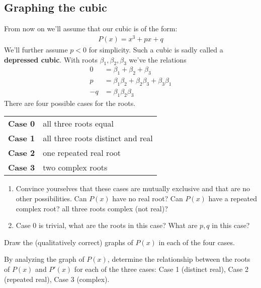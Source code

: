 \subsection{Graphing the cubic}
From now on we'll assume that our cubic is of the form:
\begin{align}
	P(x) = x^3 + px + q
\end{align}
We'll further assume $ p < 0$ for simplicity. Such a cubic is sadly called a \textbf{depressed cubic}. With roots $ \beta_1, \beta_2, \beta_3$ we've the relations
\begin{align*}
	0  & = \beta_1 + \beta_2 + \beta_3                    \\
	p  & = \beta_1 \beta_2 + \beta_2 \beta_3 + \beta_3\beta_1 \\
	-q & = \beta_1 \beta_2 \beta_3                        
\end{align*}  
There are four possible cases for the roots.
\begin{center}
	\begin{tabular}{rl}
		\textbf{Case 0} & all three roots equal                     \\
		\textbf{Case 1} & all three roots distinct and real                   \\
		\textbf{Case 2} & one repeated real root  \\
		\textbf{Case 3} & two complex roots
	\end{tabular}
\end{center}

\begin{questions}[resume]
	\item \begin{enumerate}
		\item Convince yourselves that these cases are mutually exclusive and that are no other possibilities. Can $ P(x)$ have no real root? Can $ P(x)$ have a repeated complex root? all three roots complex (not real)?
		\item Case 0 is trivial, what are the roots in this case? What are $ p,q$ in this case?
	\end{enumerate}
\end{questions}
\begin{questions}[resume]
	\item Draw the (qualitatively correct) graphs of $ P(x)$ in each of the four cases.
\end{questions}
\begin{questions}[resume]
	\item By analyzing the graph of $ P(x)$, determine the relationship between the roots of $P(x)$ and $ P'(x)$ for each of the three cases: Case 1 (distinct real), Case 2 (repeated real), Case 3 (complex).
\end{questions}

